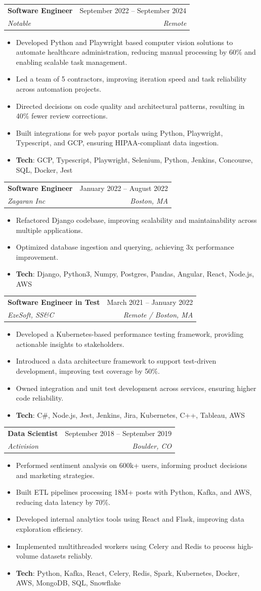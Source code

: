 \documentclass[letterpaper,11pt]{article}
\makeatletter
\newcommand{\resumeItem}[1]{
  \item\small{
    {#1 \vspace{-2pt}}
  }
}
\newcommand{\resumeSubheading}[4]{
  \vspace{-2pt}\item
    \begin{tabular*}{0.97\textwidth}[t]{l@{\extracolsep{\fill}}r}
      \textbf{#1} & #2 \\
      \textit{\small#3} & \textit{\small #4} \\
    \end{tabular*}\vspace{-7pt}
}
\newcommand{\resumeItemListStart}{\begin{itemize}}
\newcommand{\resumeItemListEnd}{\end{itemize}\vspace{-5pt}}
\makeatother
\begin{document}
    \resumeSubheading
      {Software Engineer}{September 2022 -- September 2024}
      {Notable}{Remote}
      \resumeItemListStart
        \resumeItem{Developed Python and Playwright based computer vision solutions to automate healthcare administration, reducing manual processing by 60\% and enabling scalable task management.}
        \resumeItem{Led a team of 5 contractors, improving iteration speed and task reliability across automation projects.}
        \resumeItem{Directed decisions on code quality and architectural patterns, resulting in 40\% fewer review corrections.}
        \resumeItem{Built integrations for web payor portals using Python, Playwright, Typescript, and GCP, ensuring HIPAA-compliant data ingestion.}
        \resumeItem{\textbf{Tech}: GCP, Typescript, Playwright, Selenium, Python, Jenkins, Concourse, SQL, Docker, Jest}
      \resumeItemListEnd

    \resumeSubheading
      {Software Engineer}{January 2022 -- August 2022}
      {Zagaran Inc}{Boston, MA}
      \resumeItemListStart
        \resumeItem{Refactored Django codebase, improving scalability and maintainability across multiple applications.}
        \resumeItem{Optimized database ingestion and querying, achieving 3x performance improvement.}
        \resumeItem{\textbf{Tech}: Django, Python3, Numpy, Postgres, Pandas, Angular, React, Node.js, AWS}
      \resumeItemListEnd

    \resumeSubheading
      {Software Engineer in Test}{March 2021 -- January 2022}
      {EzeSoft, SS\&C}{Remote / Boston, MA}
      \resumeItemListStart
        \resumeItem{Developed a Kubernetes-based performance testing framework, providing actionable insights to stakeholders.}
        \resumeItem{Introduced a data architecture framework to support test-driven development, improving test coverage by 50\%.}
        \resumeItem{Owned integration and unit test development across services, ensuring higher code reliability.}
        \resumeItem{\textbf{Tech}: C\#, Node.js, Jest, Jenkins, Jira, Kubernetes, C++, Tableau, AWS}
      \resumeItemListEnd

    \resumeSubheading
      {Data Scientist}{September 2018 -- September 2019}
      {Activision}{Boulder, CO}
      \resumeItemListStart
        \resumeItem{Performed sentiment analysis on 600k+ users, informing product decisions and marketing strategies.}
        \resumeItem{Built ETL pipelines processing 18M+ posts with Python, Kafka, and AWS, reducing data latency by 70\%.}
        \resumeItem{Developed internal analytics tools using React and Flask, improving data exploration efficiency.}
        \resumeItem{Implemented multithreaded workers using Celery and Redis to process high-volume datasets reliably.}
        \resumeItem{\textbf{Tech}: Python, Kafka, React, Celery, Redis, Spark, Kubernetes, Docker, AWS, MongoDB, SQL, Snowflake}
      \resumeItemListEnd
\end{document}
